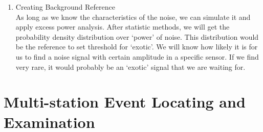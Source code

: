 \documentclass[
12pt, %
a4paper %
]{extreport}
\theoremstyle{plain}
\begin{document}
\begin{enumerate}
\begin{figure}[h]
	\caption{Time domain signals (left) and its Welch’s method's result (right)}
\label{fig:Lztest}
\end{figure}\\
People always desire to find the `optimal' parameters for analysis. From my perspective, `optimal' parameters make real signal significant. For example, if you want to search for a Lorentzian signal, of which FWHM is 0.1s, Figure \ref{fig:Lztest} tells you that you'd better focus on frequency from 0 Hz to 5Hz, where its response in frequency domain is at its maximum. \\
There should be a set of `optimal' parameters for analysis under noise with certain characteristics, and signal response to `exotic' physic in a specific sensor. But generally speaking, there's no conclusion which can figure out a general rule for deciding `optimal' parameters. 
Further details on `optimal' parameters will be addressed later in Chapter \ref{ch:MultiStat}. \\
Let's assume that we have known the `optimal' parameters, and move on to the next step. 
\item Creating Background Reference\\
As long as we know the characteristics of the noise, we can simulate it and apply excess power analysis. After statistic methods, we will get the probability density distribution over `power' of noise. This distribution would be the reference to set threshold for `exotic'. We will know how likely it is for us to find a noise signal with certain amplitude in a specific sensor. If we find very rare, it would probably be an `exotic' signal that we are waiting for. 
\end{enumerate}



\chapter{Multi-station Event Locating and Examination}\label{ch:MultiStat}
\end{document}
